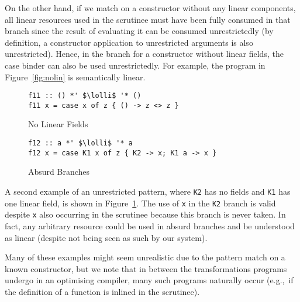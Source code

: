 \documentclass[acmsmall,review,anonymous,screen]{acmart}
\newcommand{\incode}[1]{\lstinline{#1}}
\newcommand{\lolli}{\multimap}
\begin{document}
On the other hand, if we match on a constructor without any linear components,
all linear resources used in the scrutinee must have been fully consumed in
that branch since the result of evaluating it can be consumed unrestrictedly
(by definition, a constructor application to unrestricted arguments is also
unrestricted).
%
Hence, in the branch for a constructor without linear fields, the case
binder can also be used unrestrictedly. For example, the program in
Figure~\ref{fig:nolin} is semantically linear.
%
\begin{figure}[h]
 \begin{minipage}{0.5\textwidth}
\begin{notyet}
\begin{lstlisting}
f11 :: () *' $\lolli$ '* ()
f11 x = case x of z { () -> z <> z }
\end{lstlisting}
\end{notyet}
\vspace{-0.5cm}
\caption{No Linear Fields\label{fig:nolin}}
\end{minipage}%
\begin{minipage}{0.5\textwidth}
\begin{limitation}
\begin{lstlisting}
f12 :: a *' $\lolli$ '* a
f12 x = case K1 x of z { K2 -> x; K1 a -> x }
\end{lstlisting}
\end{limitation}
\vspace{-0.5cm}
\caption{Absurd Branches\label{fig:absurd}}
\end{minipage}
\end{figure}
%
A second example of an unrestricted pattern, where \incode{K2} has no fields
and \incode{K1} has one linear field, is shown in Figure~\ref{fig:absurd}.
The use of \incode{x} in the \incode{K2} branch is valid despite \incode{x}
also occurring in the scrutinee because this branch is never taken. In fact,
any arbitrary resource could be used in absurd branches and be understood as
linear (despite not being seen as such by our system).

Many of these examples might seem unrealistic due to the pattern match on a
known constructor, but we note that in between the transformations programs
undergo in an optimising compiler, many such programs naturally occur (e.g.,~if
the definition of a function is inlined in the scrutinee).
%
\end{document}
